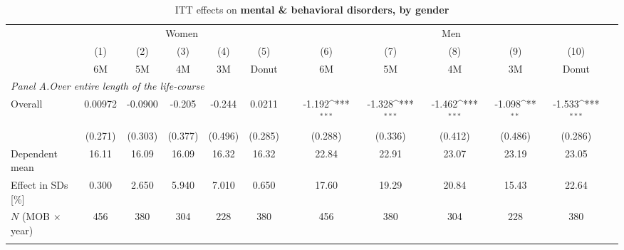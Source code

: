 \begin{landscape}
\vspace*{\fill}
 \begin{table}[H] \centering 
 	\begin{threeparttable} \centering \caption{ITT effects on \textbf{mental \& behavioral disorders, by gender}}\label{tab: DD_d5_female_male} {\def\sym#1{\ifmmode^{#1}\else\(^{#1}\)\fi} 
 			\begin{tabular}{l*{12}{c}}
 				\toprule 
 				& \multicolumn{5}{c}{Women} && \multicolumn{5}{c}{Men} \\ 
 				\cmidrule(lr){2-6} \cmidrule(lr){8-12}
 				&\multicolumn{1}{c}{(1)}&\multicolumn{1}{c}{(2)}&\multicolumn{1}{c}{(3)}&\multicolumn{1}{c}{(4)}&\multicolumn{1}{c}{(5)}&\multicolumn{1}{c}{        }&\multicolumn{1}{c}{(6)}&\multicolumn{1}{c}{(7)}&\multicolumn{1}{c}{(8)}&\multicolumn{1}{c}{(9)}&\multicolumn{1}{c}{(10)}\\
 				&\multicolumn{1}{c}{6M}&\multicolumn{1}{c}{5M}&\multicolumn{1}{c}{4M}&\multicolumn{1}{c}{3M}&\multicolumn{1}{c}{Donut}&&\multicolumn{1}{c}{6M}&\multicolumn{1}{c}{5M}&\multicolumn{1}{c}{4M}&\multicolumn{1}{c}{3M}&\multicolumn{1}{c}{Donut}\\
 				\midrule
 				\multicolumn{5}{l}{\emph{Panel A.Over entire length of the life-course}} \\


 				\hspace*{10pt}Overall&     0.00972         &     -0.0900         &      -0.205         &      -0.244         &      0.0211       & &      -1.192\sym{***}&      -1.328\sym{***}&      -1.462\sym{***}&      -1.098\sym{**} &      -1.533\sym{***}\\
				                    &     (0.271)         &     (0.303)         &     (0.377)         &     (0.496)         &     (0.285)        & &     (0.288)         &     (0.336)         &     (0.412)         &     (0.486)         &     (0.286)         \\
				\midrule Dependent mean&       16.11         &       16.09         &       16.09         &       16.32         &       16.32     & &       22.84         &       22.91         &       23.07         &       23.19         &       23.05         \\
				Effect in SDs [\%]  &       0.300         &       2.650         &       5.940         &       7.010         &       0.650        & &       17.60         &       19.29         &       20.84         &       15.43         &       22.64         \\
				\(N\) (MOB $\times$ year)&         456         &         380         &         304         &         228         &         380   & &         456         &         380         &         304         &         228         &         380         \\
				\\


\end{tabular}}
\end{threeparttable}
\end{table}
\end{landscape}
